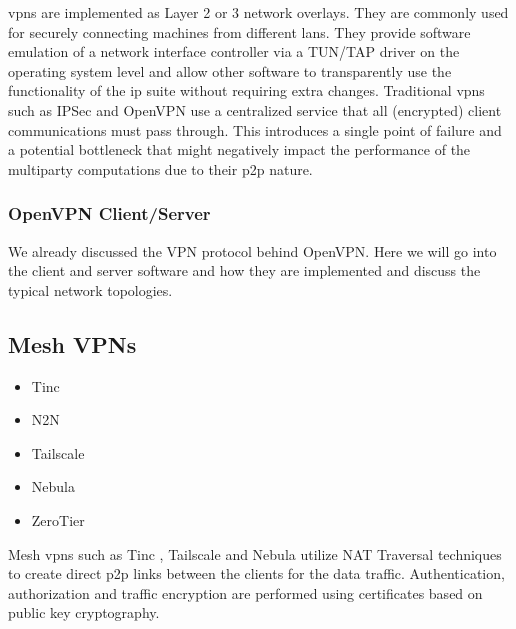 \begin{itemize}
\begin{itemize}
    \glspl{vpn} are implemented as Layer 2 or 3 network overlays. They
    are commonly used for securely connecting machines from different
    \glspl{lan}. They provide software emulation of a network interface
    controller via a TUN/TAP driver on the operating system level and
    allow other software to transparently use the functionality of the
    \gls{ip} suite without requiring extra changes. Traditional
    \glspl{vpn} such as IPSec \autocite{ipSecRFC} and OpenVPN
    \autocite{openVPNDocs} use a centralized service that all
    (encrypted) client communications must pass through. This introduces
    a single point of failure and a potential bottleneck that might
    negatively impact the performance of the multiparty computations due
    to their \gls{p2p} nature.
  \end{itemize}
\end{itemize}

\hypertarget{openvpn-clientserver}{%
\subsubsection{OpenVPN Client/Server}\label{openvpn-clientserver}}

We already discussed the VPN protocol behind OpenVPN. Here we will go
into the client and server software and how they are implemented and
discuss the typical network topologies.

\hypertarget{mesh-vpns}{%
\subsection{Mesh VPNs}\label{mesh-vpns}}

\begin{itemize}
\tightlist
\item
  Tinc
\item
  N2N
\item
  Tailscale
\item
  Nebula
\item
  ZeroTier
\end{itemize}

Mesh \glspl{vpn} such as Tinc \autocite{tincDocs}, Tailscale
\autocite{tailscaleDocs} and Nebula \autocite{nebulaDocs} utilize NAT
Traversal techniques to create direct \gls{p2p} links between the
clients for the data traffic. Authentication, authorization and traffic
encryption are performed using certificates based on public key
cryptography.

